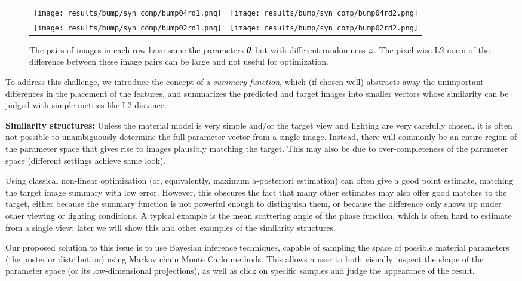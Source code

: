 \begin{figure}[t]
	\addtolength{\tabcolsep}{-3.5pt}
	\begin{tabular}{cc}
		\texttt{[image: results/bump/syn\_comp/bump04rd1.png]} &
		\texttt{[image: results/bump/syn\_comp/bump04rd2.png]} \\
		\texttt{[image: results/bump/syn\_comp/bump02rd1.png]} &
		\texttt{[image: results/bump/syn\_comp/bump02rd2.png]} \\
	\end{tabular}
	\caption{\label{fig:syn1}
		The pairs of images in each row have same the parameters $\bm{\theta}$ but with different randomness $\bm{z}$. The pixel-wise L2 norm of the difference between these image pairs can be large and not useful for optimization.
	}
\end{figure}

To address this challenge, we introduce the concept of a \emph{summary function}, which (if chosen well) abstracts away the unimportant differences in the placement of the features, and summarizes the predicted and target images into smaller vectors whose similarity can be judged with simple metrics like L2 distance.

{\bf Similarity structures:} Unless the material model is very simple and/or the target view and lighting are very carefully chosen, it is often not possible to unambiguously determine the full parameter vector from a single image. Instead, there will commonly be an entire region of the parameter space that gives rise to images plausibly matching the target. This may also be due to over-completeness of the parameter space (different settings achieve same look).

Using classical non-linear optimization (or, equivalently, maximum a-posteriori estimation) can often give a good point estimate, matching the target image summary with low error. However, this obscures the fact that many other estimates may also offer good matches to the target, either because the summary function is not powerful enough to distinguish them, or because the difference only shows up under other viewing or lighting conditions. A typical example is the mean scattering angle of the phase function, which is often hard to estimate from a single view; later we will show this and other examples of the similarity structures.

Our proposed solution to this issue is to use Bayesian inference techniques, capable of sampling the space of possible material parameters (the posterior distribution) using Markov chain Monte Carlo methods. This allows a user to both visually inspect the shape of the parameter space (or its low-dimensional projections), as well as click on specific samples and judge the appearance of the result.





